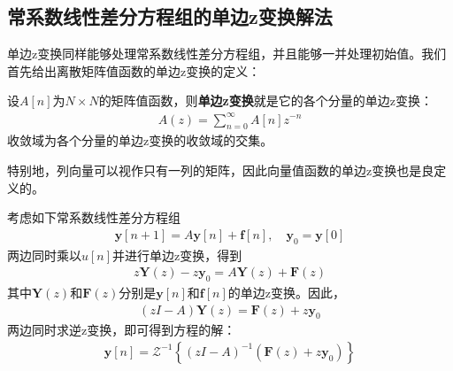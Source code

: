 \subsection{常系数线性差分方程组的单边z变换解法}\label{sub:difference_equation_system_z}

单边z变换同样能够处理常系数线性差分方程组，并且能够一并处理初始值。我们首先给出离散矩阵值函数的单边z变换的定义：

\begin{definition}[离散矩阵值函数的单边z变换]
    设$A[n]$为$N\times N$的矩阵值函数，则\textbf{单边z变换}就是它的各个分量的单边z变换：
    \begin{align*}
        A(z) = \sum_{n=0}^{\infty} A[n] z^{-n}
    \end{align*}
    收敛域为各个分量的单边z变换的收敛域的交集。
\end{definition}

特别地，列向量可以视作只有一列的矩阵，因此向量值函数的单边z变换也是良定义的。

考虑如下常系数线性差分方程组\begin{align*}
    \mathbf{y}[n+1] = A \mathbf{y}[n] + \mathbf{f}[n],\quad \mathbf{y}_0 = \mathbf{y}[0]
\end{align*}
两边同时乘以$u[n]$并进行单边z变换，得到\begin{align*}
    z\mathbf{Y}(z) - z\mathbf{y}_0 = A \mathbf{Y}(z) + \mathbf{F}(z)
\end{align*}
其中$\mathbf{Y}(z)$和$\mathbf{F}(z)$分别是$\mathbf{y}[n]$和$\mathbf{f}[n]$的单边z变换。因此，\begin{align*}
    (zI - A) \mathbf{Y}(z) = \mathbf{F}(z) + z\mathbf{y}_0
\end{align*}
两边同时求逆z变换，即可得到方程的解：\begin{align*}
    \mathbf{y}[n] = \mathcal{Z}^{-1} \left\{(zI - A)^{-1} (\mathbf{F}(z) + z\mathbf{y}_0)\right\}\tag{$**$}
\end{align*}

